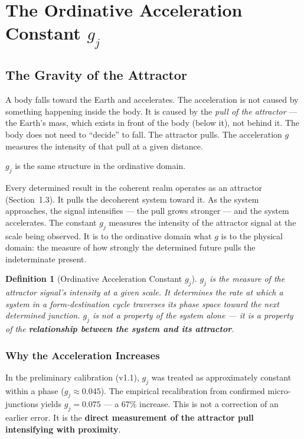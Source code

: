 \documentclass[12pt,a4paper]{article}
\newtheorem{definition}{Definition}[section]
\newcommand{\gj}{g_j}
\begin{document}
\section{The Ordinative Acceleration Constant $\gj$}\label{sec:gj}

\subsection{The Gravity of the Attractor}\label{subsec:gj_gravity}

A body falls toward the Earth and accelerates. The acceleration is not caused by something happening inside the body. It is caused by the \emph{pull of the attractor} --- the Earth's mass, which exists in front of the body (below it), not behind it. The body does not need to ``decide'' to fall. The attractor pulls. The acceleration $g$ measures the intensity of that pull at a given distance.

$\gj$ is the same structure in the ordinative domain.

Every determined result in the coherent realm operates as an attractor (Section~1.3). It pulls the decoherent system toward it. As the system approaches, the signal intensifies --- the pull grows stronger --- and the system accelerates. The constant $\gj$ measures the intensity of the attractor signal at the scale being observed. It is to the ordinative domain what $g$ is to the physical domain: the measure of how strongly the determined future pulls the indeterminate present.

\begin{definition}[Ordinative Acceleration Constant $\gj$]\label{def:gj}
$\gj$ is the measure of the attractor signal's intensity at a given scale. It determines the rate at which a system in a form-destination cycle traverses its phase space toward the next determined junction. $\gj$ is not a property of the system alone --- it is a property of the \textbf{relationship between the system and its attractor}.
\end{definition}

\subsubsection{Why the Acceleration Increases}

In the preliminary calibration (v1.1), $\gj$ was treated as approximately constant within a phase ($\gj \approx 0.045$). The empirical recalibration from confirmed micro-junctions yields $\gj = 0.075$ --- a 67\% increase. This is not a correction of an earlier error. It is the \textbf{direct measurement of the attractor pull intensifying with proximity}.
\end{document}
